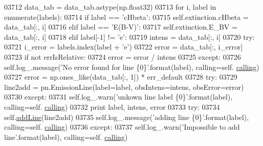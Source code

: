 \begin{DoxyCode}
03712             data\_tab = data\_tab.astype(np.float32)
03713             \textcolor{keywordflow}{for} i, label \textcolor{keywordflow}{in} enumerate(labels):
03714                 \textcolor{keywordflow}{if} label == \textcolor{stringliteral}{'cHbeta'}:
03715                     self.extinction.cHbeta = data\_tab[:, i]
03716                 \textcolor{keywordflow}{elif} label == \textcolor{stringliteral}{'E(B-V)'}:
03717                     self.extinction.E\_BV = data\_tab[:, i]
03718                 \textcolor{keywordflow}{elif} label[-1] != \textcolor{stringliteral}{'e'}:
03719                     intens = data\_tab[:, i]
03720                     \textcolor{keywordflow}{try}:
03721                         i\_error = labels.index(label + \textcolor{stringliteral}{'e'})
03722                         error = data\_tab[:, i\_error]
03723                         \textcolor{keywordflow}{if} \textcolor{keywordflow}{not} errIsRelative:
03724                             error = error / intens
03725                     \textcolor{keywordflow}{except}:
03726                         self.log\_.message(\textcolor{stringliteral}{'No error found for line \{0\}'}.format(label), calling=self.
      \hyperlink{classpyneb_1_1core_1_1pynebcore_1_1_observation_a2639fad9af4fefad20e4097295bd40e7}{calling})
03727                         error = np.ones\_like(data\_tab[:, 1]) * err\_default
03728                     \textcolor{keywordflow}{try}:
03729                         line2add = pn.EmissionLine(label=label, obsIntens=intens, obsError=error)
03730                     \textcolor{keywordflow}{except}:
03731                         self.log\_.warn(\textcolor{stringliteral}{'unkown line label \{0\}'}.format(label), calling=self.
      \hyperlink{classpyneb_1_1core_1_1pynebcore_1_1_observation_a2639fad9af4fefad20e4097295bd40e7}{calling})
03732                         \textcolor{keywordflow}{print} label, intens, error 
03733                     \textcolor{keywordflow}{try}:
03734                         self.\hyperlink{classpyneb_1_1core_1_1pynebcore_1_1_observation_a5f4b01dbeb8d50963fb7fa21b94bfc17}{addLine}(line2add)
03735                         self.log\_.message(\textcolor{stringliteral}{'adding line \{0\}'}.format(label), calling=self.
      \hyperlink{classpyneb_1_1core_1_1pynebcore_1_1_observation_a2639fad9af4fefad20e4097295bd40e7}{calling})
03736                     \textcolor{keywordflow}{except}:
03737                         self.log\_.warn(\textcolor{stringliteral}{'Impossible to add line'}.format(label), calling=self.
      \hyperlink{classpyneb_1_1core_1_1pynebcore_1_1_observation_a2639fad9af4fefad20e4097295bd40e7}{calling})

\end{DoxyCode}
